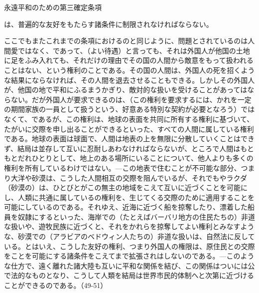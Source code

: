 永遠平和のための第三確定条項

は、普遍的な友好をもたらす諸条件に制限されなければならない。

ここでもまたこれまでの条項におけるのと同じように、問題とされているのは人間愛ではなく、であって、（よい待遇）と言っても、それは外国人が他国の土地に足をふみ入れても、それだけの理由でその国の人間から敵意をもって扱われることはない、という権利のことである。その国の人間は、外国人の死を招くような結果にならなければ、その人間を退去させることもできる。しかしその外国人が、他国の地で平和にふるまうかぎり、敵対的な扱いを受けることがあってはならない。だが外国人が要求できるのは、（この権利を要求するには、かれを一定の期間家族の一員として扱うという、好意ある特別な契約が必要となろう）ではなくて、であるが、この権利は、地球の表面を共同に所有する権利に基づいて、たがいに交際を申し出ることができるといった、すべての人間に属している権利である。地球の表面は球面で、人間は地表の上を無限に分散していくことはできず、結局は並存して互いに忍耐しあわなければならないが、ところで人間はもともとだれひとりとして、地上のある場所にいることについて、他人よりも多くの権利を所有しているわけではない。{\——}この地表で住むことが不可能な部分、つまり大洋や砂漠は、こうした人間相互の交際を阻んでいるが、それでもやラクダ（砂漠の）は、ひとびとがこの無主の地域をこえて互いに近づくことを可能にし、人類に共通に属しているの権利を、生じてくる交際のために適用することを可能にしているのである。それゆえ、近海に近づく船を掠奪したり、漂着した船員を奴隷にするといった、海岸での（たとえばバーバリ地方の住民たちの）非道な扱いや、遊牧民族に近づくと、それをかれらを掠奪してよい権利とみなすような、砂漠での（アラビアのベドウィン人たちの）非道な扱いは、自然法に反している。とはいえ、こうした友好の権利、つまり外国人の権限は、原住民との交際をことを可能にする諸条件をこえてまで拡張されはしないのである。{\——}このような仕方で、遠く離れた諸大陸も互いに平和な関係を結び、この関係はついには公で法的なものとなり、こうして人類を結局は世界市民的体制へと次第に近づけることができるのである。（49-51）

\subsection{}


